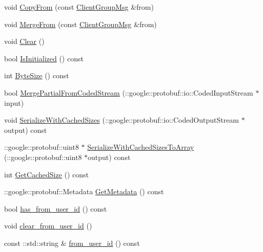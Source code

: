 \begin{DoxyCompactItemize}
void \hyperlink{class_i_m_1_1_base_define_1_1_client_group_msg_ac445bbec081a3c0d99d663a175ac5f9f}{Copy\+From} (const \hyperlink{class_i_m_1_1_base_define_1_1_client_group_msg}{Client\+Group\+Msg} \&from)
\item 
void \hyperlink{class_i_m_1_1_base_define_1_1_client_group_msg_a72d00c00f30a7e54155f50892e5f520c}{Merge\+From} (const \hyperlink{class_i_m_1_1_base_define_1_1_client_group_msg}{Client\+Group\+Msg} \&from)
\item 
void \hyperlink{class_i_m_1_1_base_define_1_1_client_group_msg_a177de8dadc6fc9e2764fd8f5764ddf24}{Clear} ()
\item 
bool \hyperlink{class_i_m_1_1_base_define_1_1_client_group_msg_ae9cc15c8730cd1291f9a82d05d9156dc}{Is\+Initialized} () const 
\item 
int \hyperlink{class_i_m_1_1_base_define_1_1_client_group_msg_ad58b2109a0fc0708c6d64059c1088d58}{Byte\+Size} () const 
\item 
bool \hyperlink{class_i_m_1_1_base_define_1_1_client_group_msg_a3c4955ca90a2be5f1355e78f559af0bd}{Merge\+Partial\+From\+Coded\+Stream} (\+::google\+::protobuf\+::io\+::\+Coded\+Input\+Stream $\ast$input)
\item 
void \hyperlink{class_i_m_1_1_base_define_1_1_client_group_msg_a95bd54b4452851f9b634cc56be373139}{Serialize\+With\+Cached\+Sizes} (\+::google\+::protobuf\+::io\+::\+Coded\+Output\+Stream $\ast$output) const 
\item 
\+::google\+::protobuf\+::uint8 $\ast$ \hyperlink{class_i_m_1_1_base_define_1_1_client_group_msg_ab6ad228b633351d7d1d5418ed151969d}{Serialize\+With\+Cached\+Sizes\+To\+Array} (\+::google\+::protobuf\+::uint8 $\ast$output) const 
\item 
int \hyperlink{class_i_m_1_1_base_define_1_1_client_group_msg_a2f54a97f06fc12b30a4f557e42145fb2}{Get\+Cached\+Size} () const 
\item 
\+::google\+::protobuf\+::\+Metadata \hyperlink{class_i_m_1_1_base_define_1_1_client_group_msg_acb5472bb4bb86bbfbe98357aebdc2aab}{Get\+Metadata} () const 
\item 
bool \hyperlink{class_i_m_1_1_base_define_1_1_client_group_msg_a9ddee64f7d1ff12ab3640f4a8547fac5}{has\+\_\+from\+\_\+user\+\_\+id} () const 
\item 
void \hyperlink{class_i_m_1_1_base_define_1_1_client_group_msg_aa6a0ec492e3bc9b27aab7c04956c8950}{clear\+\_\+from\+\_\+user\+\_\+id} ()
\item 
const \+::std\+::string \& \hyperlink{class_i_m_1_1_base_define_1_1_client_group_msg_a8560c8f5588d5433e0a220c0b985af71}{from\+\_\+user\+\_\+id} () const 

\end{DoxyCompactItemize}
